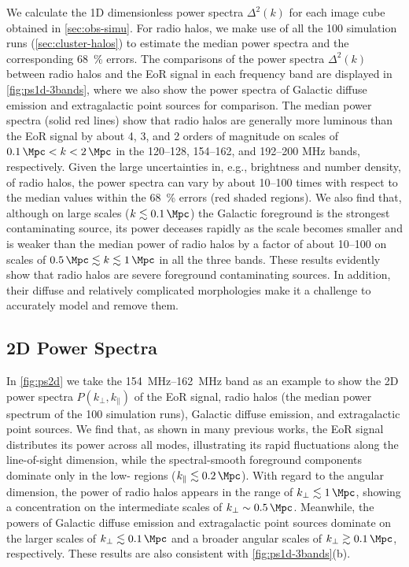 \documentclass[modern]{aastex62}
\newcommand{\klos}{\text{$k_{\parallel}$}}
\newcommand{\kperp}{\text{$k_{\bot}$}}
\begin{document}
We calculate the 1D dimensionless power spectra $\Delta^2(k)$ for each
image cube obtained in \autoref{sec:obs-simu}.
For radio halos, we make use of all the 100 simulation runs
(\autoref{sec:cluster-halos}) to estimate the median power spectra and
the corresponding \SI{68}{\percent} errors.
The comparisons of the power spectra $\Delta^2(k)$ between radio halos
and the EoR signal in each frequency band are displayed
in \autoref{fig:ps1d-3bands}, where we also show the power spectra of
Galactic diffuse emission and extragalactic point sources for comparison.
The median power spectra (solid red lines) show that radio halos are
generally more luminous than the EoR signal by about 4, 3, and 2 orders
of magnitude on scales of $\SI{0.1}{\per\Mpc} < k < \SI{2}{\per\Mpc}$
in the \numrange{120}{128}, \numrange{154}{162}, and \numrange{192}{200}
\si{\MHz} bands, respectively.
Given the large uncertainties in, e.g., brightness and number density,
of radio halos, the power spectra can vary by about \numrange{10}{100}
times with respect to the median values within the \SI{68}{\percent}
errors (red shaded regions).
We also find that, although on large scales
($k \lesssim \SI{0.1}{\per\Mpc}$) the Galactic foreground is the
strongest contaminating source, its power deceases rapidly as the
scale becomes smaller and is weaker than the median power of radio halos
by a factor of about \numrange{10}{100} on scales of
$\SI{0.5}{\per\Mpc} \lesssim k \lesssim \SI{1}{\per\Mpc}$
in all the three bands.
These results evidently show that radio halos are severe foreground
contaminating sources.
In addition, their diffuse and relatively complicated morphologies make
it a challenge to accurately model and remove them.


\subsection{2D Power Spectra}
\label{sec:ps2d}

In \autoref{fig:ps2d} we take the \SIrange{154}{162}{\MHz} band as an
example to show the 2D power spectra $P(\kperp, \klos)$ of the EoR signal,
radio halos (the median power spectrum of the 100 simulation runs),
Galactic diffuse emission, and extragalactic point sources.
We find that, as shown in many previous works,
the EoR signal distributes its power across all \klos{} modes,
illustrating its rapid fluctuations along the line-of-sight dimension,
while the spectral-smooth foreground components dominate only in the
low-\klos{} regions ($\klos{} \lesssim \SI{0.2}{\per\Mpc}$).
With regard to the angular dimension, the power of radio halos appears in
the range of $\kperp \lesssim \SI{1}{\per\Mpc}$, showing a concentration
on the intermediate scales of $\kperp \sim \SI{0.5}{\per\Mpc}$.
Meanwhile, the powers of Galactic diffuse emission and extragalactic
point sources dominate on the larger scales of
$\kperp \lesssim \SI{0.1}{\per\Mpc}$ and a broader angular scales of
$\kperp \gtrsim \SI{0.1}{\per\Mpc}$, respectively.
These results are also consistent with \autoref{fig:ps1d-3bands}(b).
\end{document}
